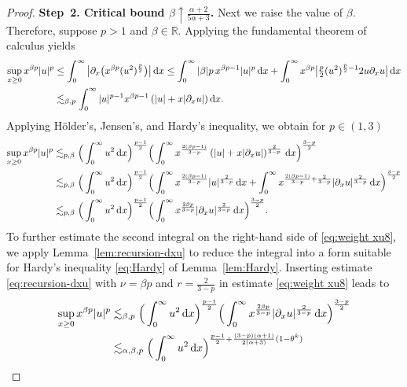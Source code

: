 \documentclass[reqno,12pt]{amsart}
\renewcommand{\d}{\ensuremath{\mathrm{d}}}
\newcommand{\R}{\ensuremath{\mathbb{R}}}
\renewcommand{\d}{\ensuremath{{\rm d}}}
\numberwithin{equation}{section}
\begin{document}
\begin{proof}
\noindent\textbf{Step~2. Critical bound $\beta \uparrow \frac{\alpha+2}{5\alpha+3}$.} Next we raise the value of $\beta$. Therefore, suppose $p > 1$ and $\beta \in \R$. Applying the fundamental theorem of calculus yields
%
\begin{align*}
\sup_{x \ge 0} x^{\beta p} |u|^p & \le \int_0^\infty \big|\partial_x \big(x^{\beta p} (u^2)^{\frac p 2}\big)\big| \, \d x 
\le \int_0^\infty |\beta| p \, x^{\beta p -1} |u|^p \, \d x + \int_0^\infty x^{\beta p} \big|\tfrac p 2 (u^2)^{\frac p 2 - 1} 2 u \partial_x u\big| \, \d x \\
&\lesssim_{\beta,p} \int_0^\infty  |u|^{p-1} x^{\beta p -1} \left( |u| + x |\partial_x u| \right) \d x. 
\end{align*}
%
Applying H\"older’s, Jensen’s, and Hardy’s inequality, we obtain for $p\in(1,3)$
%
\begin{align}
	\sup_{x \ge 0} x^{\beta p} |u|^p
& \lesssim_{p,\beta} \Big( \int_0^\infty  u^{2}  \, \d x \Big)^{\frac{p-1}{2}}\Big( \int_0^\infty  x^{\frac{2(\beta p-1)}{3-p}} \left( |u| + x |\partial_x u|\right)^{\frac{2}{3-p}} \, \d x\Big)^{\frac{3-p}{2}} \nonumber \\
& \lesssim_{p,\beta}  \Big( \int_0^\infty  u^{2}  \, \d x \Big)^{\frac{p-1}{2}} 
\Big( \int_0^\infty  x^{\frac{2(\beta p-1)}{3-p}} |u| ^{\frac{2}{3-p}} \, \d x 
+  \int_0^\infty  x^{\frac{2(\beta p-1)}{3-p} + \frac{2}{3-p}} |\partial_x u| ^{\frac{2}{3-p}} \, \d x
\Big)^{\frac{3-p}{2}} \nonumber \\
& \lesssim_{p,\beta}  \Big( \int_0^\infty  u^{2}  \, \d x \Big)^{\frac{p-1}{2}} 
\Big( \int_0^\infty  x^{\frac{2 \beta p}{3-p}} |\partial_x u| ^{\frac{2}{3-p}} \, \d x
\Big)^{\frac{3-p}{2}}.
\label{eq:weight xu8}
\end{align}
%
To further estimate the second integral on the right-hand side of \eqref{eq:weight xu8}, we apply Lemma~\ref{lem:recursion-dxu} to reduce the integral into a form suitable for Hardy’s inequality \eqref{eq:Hardy} of Lemma~\ref{lem:Hardy}. 
%
Inserting estimate \eqref{eq:recursion-dxu} with $\nu =\beta p$ and $r = \frac{2}{3-p}$ in estimate  \eqref{eq:weight xu8} leads to
%
\begin{align}
\sup_{x \ge 0} x^{\beta p} |u|^p 
& \lesssim_{\beta,p}  \Big( \int_0^\infty  u^{2}  \, \d x \Big)^{\frac{p-1}{2}} 
\Big( \int_0^\infty  x^{\frac{2 \beta p}{3-p}} |\partial_x u| ^{\frac{2}{3-p}} \, \d x
\Big)^{\frac{3-p}{2}} \nonumber \\
&\lesssim_{\alpha,\beta,p} \Big(  \int_0^\infty  u^2 \, \d x \Big)^{\frac{p-1}{2} + \frac{(3-p)(\alpha+1)}{2(\alpha+3)}(1- \theta^k)} 

\end{align}
\end{proof}
\end{document}

